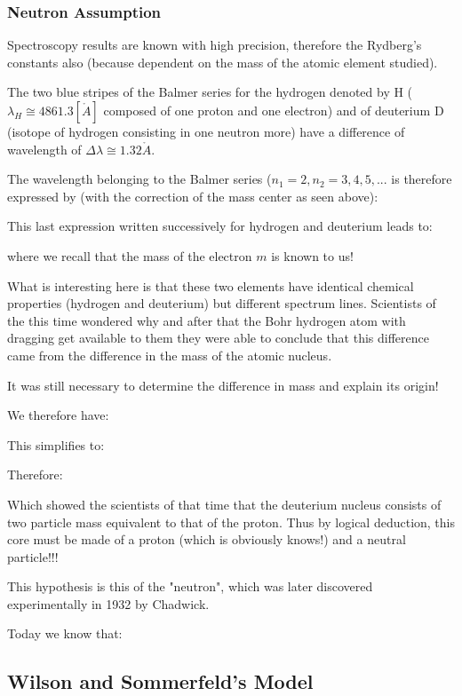 	\subsubsection{Neutron Assumption}

Spectroscopy results are known with high precision, therefore the Rydberg's constants also (because dependent on the mass of the atomic element studied).

The two blue stripes of the  Balmer series for the hydrogen denoted  by H ($\lambda_H\cong 4861.3 \left[ \mathring{A} \right]$ composed of one proton and one electron) and of deuterium $\mathrm{D}$ (isotope of hydrogen consisting in one neutron more) have a difference of wavelength of $\Delta \lambda \cong 1.32 \mathring{A}$.

The wavelength belonging to the Balmer series ($n_1=2,n_2=3,4,5,...$ is therefore expressed by (with the correction of the mass center as seen above):
	
	This last expression written successively for hydrogen and deuterium leads to:
	
	where we recall that the mass of the electron $m$ is known to us! 
	
	What is interesting here is that these two elements have identical chemical properties (hydrogen and deuterium) but different spectrum lines. Scientists of the this time wondered why and after that the Bohr hydrogen atom with dragging get available to them they were able to conclude that this difference came from the difference in the mass of the atomic nucleus.
	
	It was still necessary to determine the difference in mass and explain its origin!
	
	We therefore have:
	
	This simplifies to:
	
	Therefore:
	
	Which showed the scientists of that time that the deuterium nucleus consists of two particle mass equivalent to that of the proton. Thus by logical deduction, this core must be made of a proton (which is obviously knows!) and a neutral particle!!!
	
	This hypothesis is this of the "neutron", which was later discovered experimentally in 1932 by Chadwick.
	
	Today we know that:
	
	
	\pagebreak	
	\subsection{Wilson and Sommerfeld's Model}\label{wilson and sommerfled model}
	
